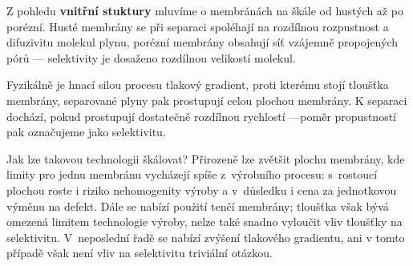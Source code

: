 \par Z pohledu \textbf{vnitřní stuktury} mluvíme o membránách na škále od hustých až po porézní. Husté membrány se při separaci spoléhají na rozdílnou rozpustnost a difuzivitu molekul plynu, porézní membrány obsahují síť vzájemně propojených pórů --- selektivity je dosaženo rozdílnou velikostí molekul. 

\par Fyzikálně je hnací silou procesu tlakový gradient, proti kterému stojí tloušťka membrány, separované plyny pak prostupují celou plochou membrány. K separaci dochází, pokud prostupují dostatečně rozdílnou rychlostí ---poměr propustností pak označujeme jako selektivitu.

\par Jak lze takovou technologii škálovat? Přirozeně lze zvětšit plochu membrány, kde limity pro jednu membránu vycházejí spíše z~výrobního procesu: s~rostoucí plochou roste i riziko nehomogenity výroby a v~důsledku i cena za jednotkovou výměnu na defekt. Dále se nabízí použití tenčí membrány; tloušťka však bývá omezená limitem technologie výroby, nelze také snadno vyloučit vliv tloušťky na selektivitu. V~neposlední řadě se nabízí zvýšení tlakového gradientu, ani v tomto případě však není vliv na selektivitu triviální otázkou.

\subsection{}